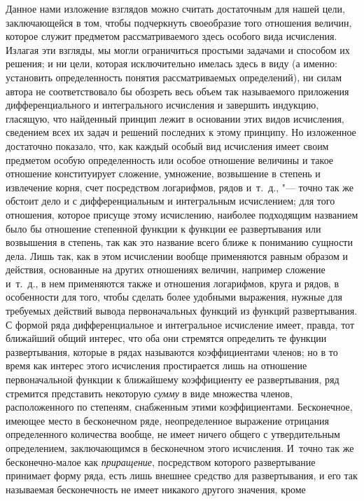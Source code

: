 Данное нами изложение взглядов можно считать достаточным для нашей цели,
заключающейся в том, чтобы подчеркнуть своеобразие того отношения величин,
которое служит предметом рассматриваемого здесь особого вида исчисления.
Излагая эти взгляды, мы могли ограничиться простыми задачами и способом их
решения; и ни цели, которая исключительно имелась здесь в виду (а именно:
установить определенность понятия рассматриваемых определений), ни силам
автора не соответствовало бы обозреть весь объем так называемого приложения
дифференциального и интегрального исчисления и завершить индукцию, гласящую,
что найденный принцип лежит в основании этих видов исчисления, сведением
всех их задач и решений последних к этому принципу. Но изложенное
достаточно показало, что, как каждый особый вид исчисления имеет своим
предметом особую определенность или особое отношение величины и такое
отношение конституирует сложение, умножение, возвышение в степень и
извлечение корня, счет посредством логарифмов, рядов и~т.~д., "--- точно так
же обстоит дело и с дифференциальным и интегральным исчислением; для того
отношения, которое присуще этому исчислению, наиболее подходящим названием
было бы отношение степенной функции к функции ее развертывания или
возвышения в степень, так как это название всего ближе к пониманию сущности
дела. Лишь так, как в этом исчислении вообще применяются равным образом и
действия, основанные на других отношениях величин, например сложение
и~т.~д., в нем применяются также и отношения логарифмов, круга и рядов, в
особенности для того, чтобы сделать более удобными выражения, нужные для
требуемых действий вывода первоначальных функций из функций развертывания.
С формой ряда дифференциальное и интегральное исчисление имеет, правда, тот
ближайший общий интерес, что оба они стремятся определить те функции
развертывания, которые в рядах называются коэффициентами членов; но в то
время как интерес этого исчисления простирается лишь на отношение
первоначальной функции к ближайшему коэффициенту ее развертывания, ряд
стремится представить некоторую {\em сумму} в виде
множества членов, расположенного по степеням, снабженным этими
коэффициентами. Бесконечное, имеющее место в бесконечном ряде,
неопределенное выражение отрицания определенного количества вообще, не
имеет ничего общего с утвердительным определением, заключающимся в
бесконечном этого исчисления. И~точно так же бесконечно-малое как
{\em приращение}, посредством которого развертывание
принимает форму ряда, есть лишь внешнее средство для развертывания, и его
так называемая бесконечность не имеет никакого другого значения, кроме
